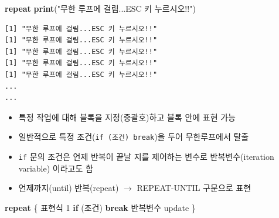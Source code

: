 \documentclass[
  11pt,
]{krantz}
\newenvironment{Shaded}{\begin{snugshade}}{\end{snugshade}}
\newcommand{\ControlFlowTok}[1]{\textcolor[rgb]{0.27,0.27,0.27}{\textbf{#1}}}
\newcommand{\DecValTok}[1]{\textcolor[rgb]{0.06,0.06,0.06}{#1}}
\newcommand{\KeywordTok}[1]{\textcolor[rgb]{0.27,0.27,0.27}{\textbf{#1}}}
\newcommand{\NormalTok}[1]{#1}
\newcommand{\StringTok}[1]{\textcolor[rgb]{0.5,0.5,0.5}{#1}}
\providecommand{\tightlist}{%
  \setlength{\itemsep}{0pt}\setlength{\parskip}{0pt}}
\begin{document}
\footnotesize

\begin{Shaded}
\begin{Highlighting}[]
\ControlFlowTok{repeat} \KeywordTok{print}\NormalTok{(}\StringTok{"무한 루프에 걸림...ESC 키 누르시오!!"}\NormalTok{)}
\end{Highlighting}
\end{Shaded}

\normalsize

\begin{verbatim}
[1] "무한 루프에 걸림...ESC 키 누르시오!!"
[1] "무한 루프에 걸림...ESC 키 누르시오!!"
[1] "무한 루프에 걸림...ESC 키 누르시오!!"
[1] "무한 루프에 걸림...ESC 키 누르시오!!"
[1] "무한 루프에 걸림...ESC 키 누르시오!!"
...
...
\end{verbatim}

\begin{itemize}
\tightlist
\item
  특정 작업에 대해 블록을 지정(중괄호)하고 블록 안에 표현 가능
\item
  일반적으로 특정 조건(\texttt{if\ (조건)\ break})을 두어 무한루프에서 탈출
\item
  \texttt{if} 문의 조건은 언제 반복이 끝날 지를 제어하는 변수로 반복변수(iteration variable) 이라고도 함
\item
  언제까지(until) 반복(repeat) \(\rightarrow\) REPEAT-UNTIL 구문으로 표현
\end{itemize}

\footnotesize

\begin{Shaded}
\begin{Highlighting}[]
\ControlFlowTok{repeat}\NormalTok{ \{}
\NormalTok{  표현식 }\DecValTok{1}
  \ControlFlowTok{if}\NormalTok{ (조건) }\ControlFlowTok{break}
\NormalTok{  반복변수 update}
\NormalTok{\}}
\end{Highlighting}
\end{Shaded}

\normalsize

\footnotesize
\end{document}

